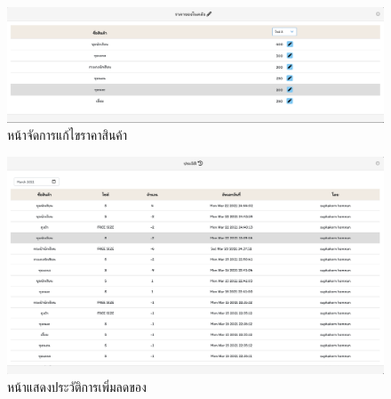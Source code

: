 \begin{itemize}
  
  
    \begin{figure}
      \begin{center}
      \includegraphics[width=\linewidth]{images/editPrice.png}
      \end{center}
      \caption[หน้าจัดการแก้ไขราคาสินค้า]{หน้าจัดการแก้ไขราคาสินค้า}
      \label{fig:editPrice}
      \end{figure}
  
  
    \begin{figure}
      \begin{center}
      \includegraphics[width=\linewidth]{images/historyStock.png}
      \end{center}
      \caption[หน้าแสดงประวัติการเพิ่มลดของ]{หน้าแสดงประวัติการเพิ่มลดของ}
      \label{fig:HistoryStock}
    \end{figure}
  

\end{itemize}
